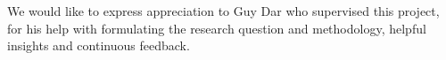 We would like to express appreciation to Guy Dar who supervised this project, for his help with formulating the research question and methodology, helpful insights and continuous feedback.